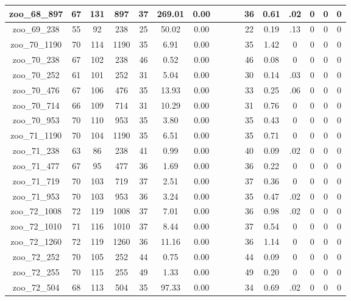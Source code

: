\begin{landscape}
\begin{longtable}{|c|c|c|c|c|c|c|c|c|c|c|c|c|c|c|c|}
zoo\_68\_897 & 67 & 131 & 897 & 37 & 269.01 & 0.00 &  &  &  & 36 & 0.61 & .02 & 0 & 0 & 0 \\ \hline 
zoo\_69\_238 & 55 & 92 & 238 & 25 & 50.02 & 0.00 &  &  &  & 22 & 0.19 & .13 & 0 & 0 & 0 \\ \hline 
zoo\_70\_1190 & 70 & 114 & 1190 & 35 & 6.91 & 0.00 &  &  &  & 35 & 1.42 & 0 & 0 & 0 & 0 \\ \hline 
zoo\_70\_238 & 67 & 102 & 238 & 46 & 0.52 & 0.00 &  &  &  & 46 & 0.08 & 0 & 0 & 0 & 0 \\ \hline 
zoo\_70\_252 & 61 & 101 & 252 & 31 & 5.04 & 0.00 &  &  &  & 30 & 0.14 & .03 & 0 & 0 & 0 \\ \hline 
zoo\_70\_476 & 67 & 106 & 476 & 35 & 13.93 & 0.00 &  &  &  & 33 & 0.25 & .06 & 0 & 0 & 0 \\ \hline 
zoo\_70\_714 & 66 & 109 & 714 & 31 & 10.29 & 0.00 &  &  &  & 31 & 0.76 & 0 & 0 & 0 & 0 \\ \hline 
zoo\_70\_953 & 70 & 110 & 953 & 35 & 3.80 & 0.00 &  &  &  & 35 & 0.43 & 0 & 0 & 0 & 0 \\ \hline 
zoo\_71\_1190 & 70 & 104 & 1190 & 35 & 6.51 & 0.00 &  &  &  & 35 & 0.71 & 0 & 0 & 0 & 0 \\ \hline 
zoo\_71\_238 & 63 & 86 & 238 & 41 & 0.99 & 0.00 &  &  &  & 40 & 0.09 & .02 & 0 & 0 & 0 \\ \hline 
zoo\_71\_477 & 67 & 95 & 477 & 36 & 1.69 & 0.00 &  &  &  & 36 & 0.22 & 0 & 0 & 0 & 0 \\ \hline 
zoo\_71\_719 & 70 & 103 & 719 & 37 & 2.51 & 0.00 &  &  &  & 37 & 0.36 & 0 & 0 & 0 & 0 \\ \hline 
zoo\_71\_953 & 70 & 103 & 953 & 36 & 3.24 & 0.00 &  &  &  & 35 & 0.47 & .02 & 0 & 0 & 0 \\ \hline 
zoo\_72\_1008 & 72 & 119 & 1008 & 37 & 7.01 & 0.00 &  &  &  & 36 & 0.98 & .02 & 0 & 0 & 0 \\ \hline 
zoo\_72\_1010 & 71 & 116 & 1010 & 37 & 8.44 & 0.00 &  &  &  & 37 & 0.54 & 0 & 0 & 0 & 0 \\ \hline 
zoo\_72\_1260 & 72 & 119 & 1260 & 36 & 11.16 & 0.00 &  &  &  & 36 & 1.14 & 0 & 0 & 0 & 0 \\ \hline 
zoo\_72\_252 & 70 & 105 & 252 & 44 & 0.75 & 0.00 &  &  &  & 44 & 0.09 & 0 & 0 & 0 & 0 \\ \hline 
zoo\_72\_255 & 70 & 115 & 255 & 49 & 1.33 & 0.00 &  &  &  & 49 & 0.20 & 0 & 0 & 0 & 0 \\ \hline 
zoo\_72\_504 & 68 & 113 & 504 & 35 & 97.33 & 0.00 &  &  &  & 34 & 0.69 & .02 & 0 & 0 & 0 \\ \hline 

\end{longtable}
\end{landscape}
